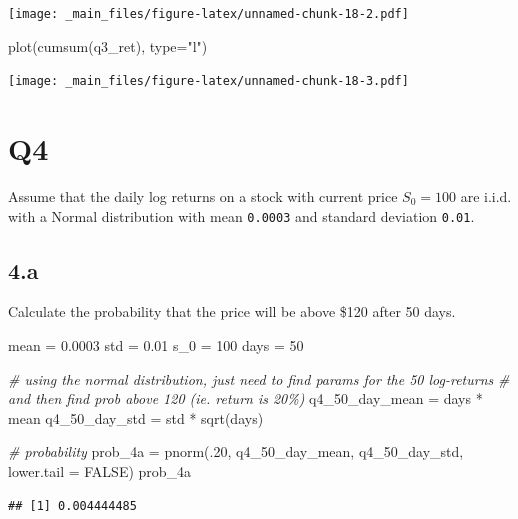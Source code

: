 \documentclass[
  oneside]{book}
\newenvironment{Shaded}{\begin{snugshade}}{\end{snugshade}}
\newcommand{\AttributeTok}[1]{\textcolor[rgb]{0.77,0.63,0.00}{#1}}
\newcommand{\CommentTok}[1]{\textcolor[rgb]{0.56,0.35,0.01}{\textit{#1}}}
\newcommand{\ConstantTok}[1]{\textcolor[rgb]{0.00,0.00,0.00}{#1}}
\newcommand{\DecValTok}[1]{\textcolor[rgb]{0.00,0.00,0.81}{#1}}
\newcommand{\FloatTok}[1]{\textcolor[rgb]{0.00,0.00,0.81}{#1}}
\newcommand{\FunctionTok}[1]{\textcolor[rgb]{0.00,0.00,0.00}{#1}}
\newcommand{\NormalTok}[1]{#1}
\newcommand{\OtherTok}[1]{\textcolor[rgb]{0.56,0.35,0.01}{#1}}
\newcommand{\SpecialCharTok}[1]{\textcolor[rgb]{0.00,0.00,0.00}{#1}}
\newcommand{\StringTok}[1]{\textcolor[rgb]{0.31,0.60,0.02}{#1}}
\begin{document}
\texttt{[image: \_main\_files/figure-latex/unnamed-chunk-18-2.pdf]}

\begin{Shaded}
\begin{Highlighting}[]
\FunctionTok{plot}\NormalTok{(}\FunctionTok{cumsum}\NormalTok{(q3\_ret), }\AttributeTok{type=}\StringTok{"l"}\NormalTok{)}
\end{Highlighting}
\end{Shaded}

\texttt{[image: \_main\_files/figure-latex/unnamed-chunk-18-3.pdf]}

\hypertarget{q4}{%
\section{Q4}\label{q4}}

Assume that the daily log returns on a stock with current price \(S_0 = 100\) are i.i.d. with a Normal distribution with mean \texttt{0.0003} and standard deviation \texttt{0.01}.

\hypertarget{a-1}{%
\subsection{4.a}\label{a-1}}

Calculate the probability that the price will be above \$120 after 50 days.

\begin{Shaded}
\begin{Highlighting}[]
\NormalTok{mean }\OtherTok{=} \FloatTok{0.0003}
\NormalTok{std }\OtherTok{=} \FloatTok{0.01}
\NormalTok{s\_0 }\OtherTok{=} \DecValTok{100}
\NormalTok{days }\OtherTok{=} \DecValTok{50}

\CommentTok{\# using the normal distribution, just need to find params for the 50 log{-}returns}
\CommentTok{\# and then find prob above 120 (ie. return is 20\%)}
\NormalTok{q4\_50\_day\_mean }\OtherTok{=}\NormalTok{ days }\SpecialCharTok{*}\NormalTok{ mean}
\NormalTok{q4\_50\_day\_std }\OtherTok{=}\NormalTok{ std }\SpecialCharTok{*} \FunctionTok{sqrt}\NormalTok{(days)}

\CommentTok{\# probability}
\NormalTok{prob\_4a }\OtherTok{=} \FunctionTok{pnorm}\NormalTok{(.}\DecValTok{20}\NormalTok{, q4\_50\_day\_mean, q4\_50\_day\_std, }\AttributeTok{lower.tail =} \ConstantTok{FALSE}\NormalTok{)}
\NormalTok{prob\_4a}
\end{Highlighting}
\end{Shaded}

\begin{verbatim}
## [1] 0.004444485
\end{verbatim}
\end{document}
